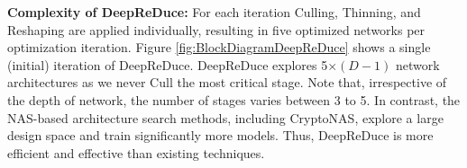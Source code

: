 {\bf Complexity of DeepReDuce:} 
For each iteration Culling, Thinning, and Reshaping are applied individually,
resulting in five optimized networks per optimization iteration. 
Figure \ref{fig:BlockDiagramDeepReDuce} shows a single (initial) iteration of DeepReDuce.
DeepReDuce explores 5$\times(D-1)$ network architectures as we never Cull the most critical stage. Note that, irrespective of the depth of network, the number of stages varies between 3 to 5. 
In contrast, the NAS-based architecture search methods, including CryptoNAS, explore a large design space and train significantly more models. 
Thus, DeepReDuce is more efficient and effective than existing techniques. 











